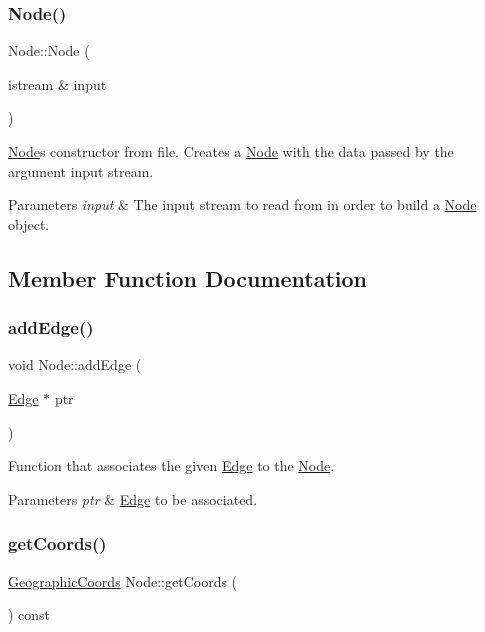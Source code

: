 \subsubsection{\texorpdfstring{Node()}{Node()}}
{\footnotesize\ttfamily Node\+::\+Node (\begin{DoxyParamCaption}\item[{istream \&}]{input }\end{DoxyParamCaption})}

\hyperlink{class_node}{Node}\textquotesingle{}s constructor from file. Creates a \hyperlink{class_node}{Node} with the data passed by the argument input stream.


\begin{DoxyParams}{Parameters}
{\em input} & The input stream to read from in order to build a \hyperlink{class_node}{Node} object. \\
\hline
\end{DoxyParams}


\subsection{Member Function Documentation}
\hypertarget{class_node_a9c981148bc1602d4388c6ea6428450c4}{}\label{class_node_a9c981148bc1602d4388c6ea6428450c4} 
\subsubsection{\texorpdfstring{add\+Edge()}{addEdge()}}
{\footnotesize\ttfamily void Node\+::add\+Edge (\begin{DoxyParamCaption}\item[{\hyperlink{class_edge}{Edge} $\ast$}]{ptr }\end{DoxyParamCaption})}

Function that associates the given \hyperlink{class_edge}{Edge} to the \hyperlink{class_node}{Node}.


\begin{DoxyParams}{Parameters}
{\em ptr} & \hyperlink{class_edge}{Edge} to be associated. \\
\hline
\end{DoxyParams}
\hypertarget{class_node_a77aeb1b8ddb7776e097f5ad8a56bd0d0}{}\label{class_node_a77aeb1b8ddb7776e097f5ad8a56bd0d0} 
\subsubsection{\texorpdfstring{get\+Coords()}{getCoords()}}
{\footnotesize\ttfamily \hyperlink{class_geographic_coords}{Geographic\+Coords} Node\+::get\+Coords (\begin{DoxyParamCaption}{ }\end{DoxyParamCaption}) const}

